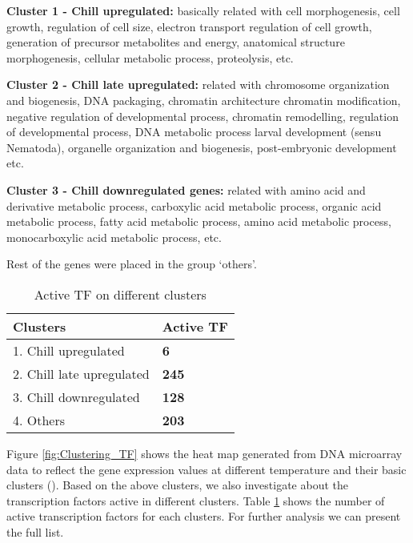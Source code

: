 \textbf{Cluster 1 - Chill upregulated:} basically related with cell morphogenesis, cell growth, regulation of cell size, electron transport regulation of cell growth, generation of precursor metabolites and energy, anatomical structure morphogenesis, cellular metabolic process, proteolysis, etc.

\textbf{Cluster 2 - Chill late upregulated:} related with chromosome organization and biogenesis, DNA packaging, chromatin architecture chromatin modification, negative regulation of developmental process, chromatin remodelling, regulation of developmental process, DNA metabolic process larval development (sensu Nematoda), organelle organization and biogenesis, post-embryonic development etc.

\textbf{Cluster 3 - Chill downregulated genes:} related with amino acid and derivative metabolic process, carboxylic acid metabolic process, organic acid metabolic process, fatty acid metabolic process, amino acid metabolic process, monocarboxylic acid metabolic process, etc.  

Rest of the genes were placed in the group \lq others\rq. 

\begin{table}[!htbp]
	\centering
  \begin{tabular}{l l }
    \toprule
    \textbf{Clusters} & \textbf{Active TF} \\
    \midrule
    1. Chill upregulated & \bf 6 \\ 
    2. Chill late upregulated & \bf245 \\ 
    3. Chill downregulated & \bf128 \\
    4. Others & \bf 203 \\
  \bottomrule
  \end{tabular}
  \caption[Active TF on different clusters]
	  {Active TF on different clusters}
  \label{table:Active_TF_diff_clusters}
\end{table}

Figure \ref{fig:Clustering_TF} shows the heat map generated from DNA microarray data to reflect the gene expression values at different temperature and their basic clusters (\cite{Cossins:2007}). Based on the above clusters, we also investigate about the transcription factors active in different clusters. Table \ref{table:Active_TF_diff_clusters} shows the number of active transcription factors for each clusters. For further analysis we can present the full list.



